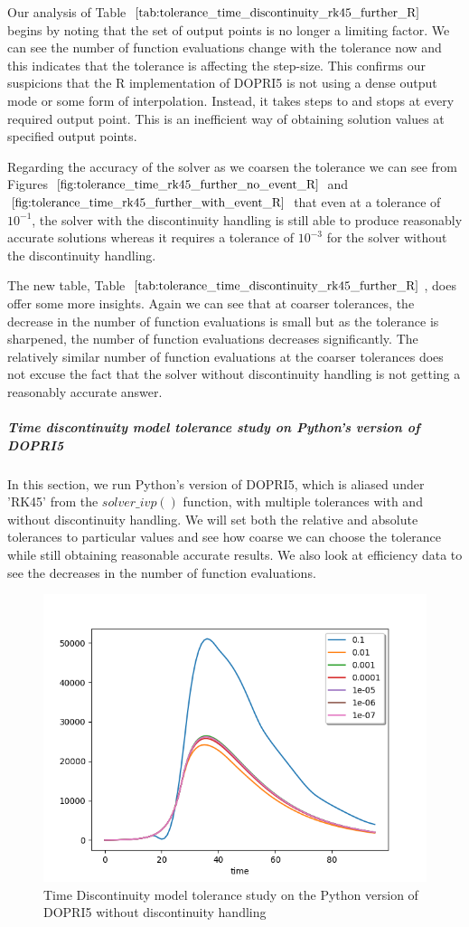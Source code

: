 Our analysis of Table $\ref{tab:tolerance_time_discontinuity_rk45_further_R}$ begins by noting that the set of output points is no longer a limiting factor. We can see the number of function evaluations change with the tolerance now and this indicates that the tolerance is affecting the step-size. This confirms our suspicions that the R implementation of DOPRI5 is not using a dense output mode or some form of interpolation. Instead, it takes steps to and stops at every required output point. This is an inefficient way of obtaining solution values at specified output points. 

Regarding the accuracy of the solver as we coarsen the tolerance we can see from Figures $\ref{fig:tolerance_time_rk45_further_no_event_R}$ and $\ref{fig:tolerance_time_rk45_further_with_event_R}$ that even at a tolerance of $10^{-1}$, the solver with the discontinuity handling is still able to produce reasonably accurate solutions whereas it requires a tolerance of $10^{-3}$ for the solver without the discontinuity handling.

The new table, Table $\ref{tab:tolerance_time_discontinuity_rk45_further_R}$, does offer some more insights. Again we can see that at coarser tolerances, the decrease in the number of function evaluations is small but as the tolerance is sharpened, the number of function evaluations decreases significantly. The relatively similar number of function evaluations at the coarser tolerances does not excuse the fact that the solver without discontinuity handling is not getting a reasonably accurate answer. 

\subparagraph{Time discontinuity model tolerance study on Python's version of DOPRI5}
In this section, we run Python's version of DOPRI5, which is aliased under 'RK45' from the $solver\_ivp()$ function, with multiple tolerances with and without discontinuity handling. We will set both the relative and absolute tolerances to particular values and see how coarse we can choose the tolerance while still obtaining reasonable accurate results. We also look at efficiency data to see the decreases in the number of function evaluations.

\begin{figure}[h]
\centering
\includegraphics[width=0.7\linewidth]{./figures/tolerance_time_rk45_no_event_py}
\caption{Time Discontinuity model tolerance study on the Python version of DOPRI5 without discontinuity handling}
\label{fig:tolerance_time_rk45_no_event_py}
\end{figure}

